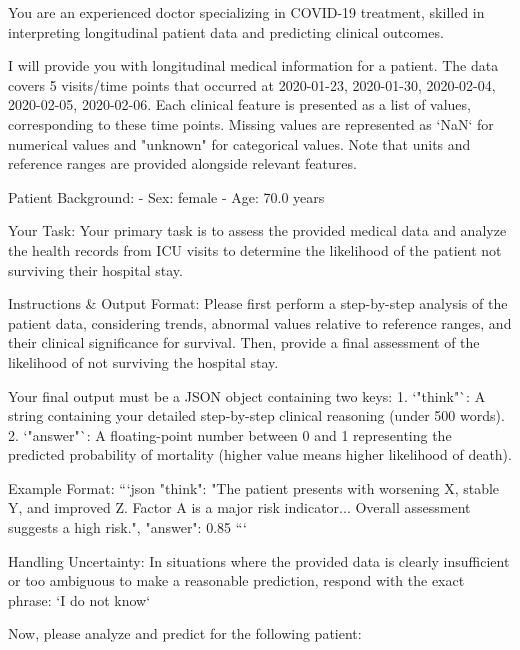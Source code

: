 \begin{tcolorbox}[colback=cadmiumgreen!5!white,colframe=forestgreen!75!white,breakable,title=\textit{Optimized setting prompt template for the mortality prediction task on the TJH.}]
\begin{VerbatimWrap}
You are an experienced doctor specializing in COVID-19 treatment, skilled in interpreting longitudinal patient data and predicting clinical outcomes.

I will provide you with longitudinal medical information for a patient. The data covers 5 visits/time points that occurred at 2020-01-23, 2020-01-30, 2020-02-04, 2020-02-05, 2020-02-06.
Each clinical feature is presented as a list of values, corresponding to these time points. Missing values are represented as `NaN` for numerical values and "unknown" for categorical values. Note that units and reference ranges are provided alongside relevant features.

Patient Background:
- Sex: female
- Age: 70.0 years

Your Task:
Your primary task is to assess the provided medical data and analyze the health records from ICU visits to determine the likelihood of the patient not surviving their hospital stay.

Instructions & Output Format:
Please first perform a step-by-step analysis of the patient data, considering trends, abnormal values relative to reference ranges, and their clinical significance for survival. Then, provide a final assessment of the likelihood of not surviving the hospital stay.

Your final output must be a JSON object containing two keys:
1.  `"think"`: A string containing your detailed step-by-step clinical reasoning (under 500 words).
2.  `"answer"`: A floating-point number between 0 and 1 representing the predicted probability of mortality (higher value means higher likelihood of death).

Example Format: ```json { "think": "The patient presents with worsening X, stable Y, and improved Z. Factor A is a major risk indicator... Overall assessment suggests a high risk.", "answer": 0.85 }```

Handling Uncertainty:
In situations where the provided data is clearly insufficient or too ambiguous to make a reasonable prediction, respond with the exact phrase: `I do not know`

Now, please analyze and predict for the following patient:


\end{VerbatimWrap}
\end{tcolorbox}
